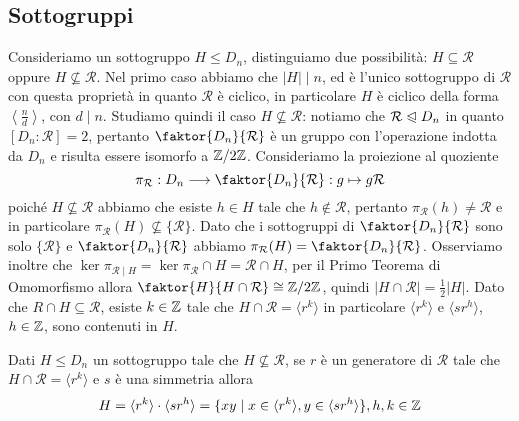 \documentclass[11pt]{scrartcl}
\begin{document}
\subsection{Sottogruppi}

Consideriamo un sottogruppo $H\leqslant D_n$, distinguiamo due possibilità: 
$H \subseteq \mathcal{R}$ oppure $H \nsubseteq \mathcal{R}$. Nel primo caso
abbiamo che $|H|\mid n$, ed è l'unico sottogruppo di $\mathcal{R}$ con questa 
proprietà in quanto $\mathcal{R}$ è ciclico, in particolare $H$ è ciclico 
della forma $ \displaystyle\left<\frac n d\right>$, con $d \mid n$. \newline
Studiamo quindi il caso $H \nsubseteq \mathcal{R}$: notiamo che 
$\mathcal{R}\trianglelefteqslant D_n$ in quanto $[D_n : \mathcal{R}] = 2$,
pertanto $\faktor{D_n}{\mathcal{R}}$ è un gruppo con l'operazione indotta da $D_n$
e risulta essere isomorfo a $\mathbb{Z}/{2}\mathbb{Z}$. \newline
Consideriamo la proiezione al quoziente \[
    \pi_{\mathcal{R}}: D_n \longrightarrow \faktor{D_n}{\mathcal{R}} : g \mapsto g\mathcal{R}
\]poiché $H \nsubseteq \mathcal{R}$ abbiamo che esiste $h \in H$ tale che 
$h \notin \mathcal{R}$, pertanto $\pi_{\mathcal{R}}(h) \neq \mathcal{R}$ e
in particolare $\pi_{\mathcal{R}}(H) \nsubseteq \{\mathcal{R}\}$. Dato che i 
sottogruppi di $\faktor{D_n}{\mathcal{R}}$ sono solo $\{\mathcal{R}\}$ e
$\faktor{D_n}{\mathcal{R}}$ abbiamo $\pi_{\mathcal{R}}(H) = 
\faktor{D_n}{\mathcal{R}}$. Osserviamo inoltre che $\ker \pi_{\mathcal{R}\mid H} = 
\ker \pi_{\mathcal{R}} \cap H = \mathcal{R}\cap H$, per il Primo Teorema di Omomorfismo
allora $\faktor{H}{H\cap \mathcal{R}} \cong \Z2$, quindi 
$|H\cap\mathcal{R}| = \displaystyle\frac 1 2 |H|$. Dato che $R\cap H \subseteq
\mathcal{R}$, esiste $k \in \mathbb Z$ tale che $H\cap\mathcal{R} = \langle r^k\rangle$
in particolare $\langle r^k\rangle$ e $\langle sr^h\rangle$, $h \in \mathbb Z$, sono
contenuti in $H$. 

\begin{proposition}
    Dati $H\leqslant D_n$ un sottogruppo tale che $H\nsubseteq \mathcal{R}$, se
    $r$ è un generatore di $\mathcal{R}$ tale che $H\cap\mathcal{R} = \langle r^k\rangle$ 
    e $s$ è una simmetria allora \[
    H = \langle r^k\rangle\cdot\langle sr^h\rangle = \{xy \mid x \in \langle r^k\rangle,
    y \in \langle sr^h\rangle\}, h, k \in \mathbb Z
    \]
\end{proposition}
\end{document}
